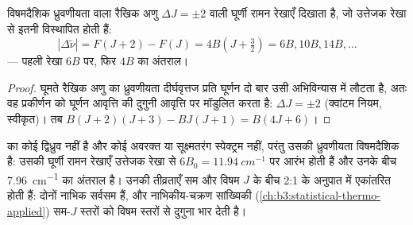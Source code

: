 \begin{proposition}[घूर्णी रामन रेखाएँ]\label{prop:b3:rovibrational-spectroscopy:rotational-raman}
विषमदैशिक ध्रुवणीयता वाला रैखिक अणु $\Delta J = \pm2$ वाली घूर्णी रामन
रेखाएँ दिखाता है, जो उत्तेजक रेखा से इतनी विस्थापित होती हैं:
\[
|\Delta\tilde\nu| = F(J+2) - F(J) = 4B(J + \tfrac32) = 6B, 10B, 14B, \dots
\]
--- पहली रेखा $6B$ पर, फिर $4B$ का अंतराल।
\end{proposition}

\begin{proof}
घूमते रैखिक अणु का ध्रुवणीयता दीर्घवृत्तज प्रति घूर्णन दो बार उसी
अभिविन्यास में लौटता है, अतः वह प्रकीर्णन को घूर्णन आवृत्ति की दुगुनी आवृत्ति पर
मॉडुलित करता है: $\Delta J = \pm2$ (क्वांटम नियम, स्वीकृत)। तब
$B(J+2)(J+3) - BJ(J+1) = B(4J + 6)$।
\end{proof}

\begin{example}[रामन द्वारा देखा गया नाइट्रोजन]\label{ex:b3:rovibrational-spectroscopy:n2}
 का कोई द्विध्रुव नहीं है और कोई अवरक्त या सूक्ष्मतरंग स्पेक्ट्रम नहीं, परंतु उसकी
ध्रुवणीयता विषमदैशिक है: उसकी घूर्णी रामन रेखाएँ उत्तेजक रेखा से $6B_0 =
\qty{11.94}{cm^{-1}}$ पर आरंभ होती हैं और उनके बीच \qty{7.96}{cm^{-1}} का अंतराल है। उनकी
तीव्रताएँ सम और विषम $J$ के बीच 2:1 के अनुपात में एकांतरित होती हैं: दोनों  नाभिक
सर्वसम हैं, और नाभिकीय-चक्रण सांख्यिकी (\cref{ch:b3:statistical-thermo-applied})
सम-$J$ स्तरों को विषम स्तरों से दुगुना भार देती है।
\end{example}

